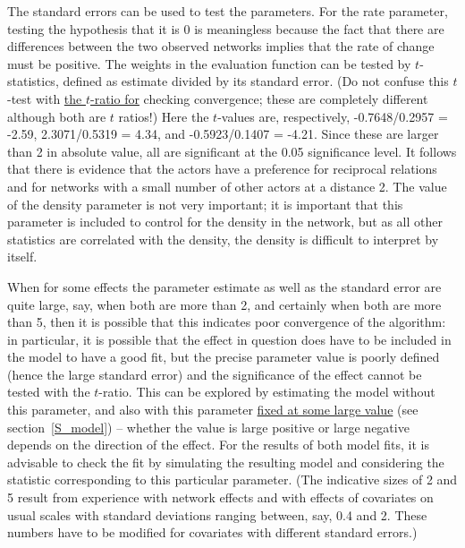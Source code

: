 \documentclass[a4paper,fleqn]{article}
\newcommand{\+}{\, + \,}
\begin{document}
{\begin{screen}
\newpage
\end{screen}
The standard errors can be used to test the parameters. For the rate
parameter, testing the hypothesis that it is 0 is meaningless
because the fact that there are differences between the two observed
networks implies that the rate of change must be positive. The
weights in the evaluation function can be tested by $t$-statistics,
defined as estimate divided by its standard error. (Do not confuse
this $t$-test with \hyperlink{T_convergence}{the $t$-ratio for}
checking convergence; these are completely different although both
are $t$ ratios!) Here the $t$-values are, respectively,
-0.7648/0.2957 = -2.59, 2.3071/0.5319 = 4.34, and -0.5923/0.1407 =
-4.21. Since these are larger than 2 in absolute value, all are
significant at the 0.05 significance level. It follows that there is
evidence that the actors have a preference for reciprocal relations
and for networks with a small number of other actors at a distance
2. The value of the density parameter is not very important; it is
important that this parameter is included to control for the density
in the network, but as all other statistics are correlated with the
density, the density is difficult to interpret by itself.

When for some effects the parameter estimate as well as the
standard error are quite large, say, when both are more than 2,
and certainly when both are more than 5, then it is possible that
this indicates poor convergence of the algorithm: in particular,
it is possible that the effect in question does have to be
included in the model to have a good fit, but the precise
parameter value is poorly defined (hence the large standard error)
and the significance of the effect cannot be tested with the
$t$-ratio. This can be explored by estimating the model without
this parameter, and also with this parameter
\hyperlink{T_fix}{fixed at some large value}
(see section~\ref{S_model}) -- whether the value is large positive or
large negative depends on the direction of the effect. For the
results of both model fits, it is advisable to check the fit by
simulating the resulting model and considering the statistic
corresponding to this particular parameter.
(The indicative sizes of 2 and 5 result from experience with
network effects and with effects of covariates on usual scales
with standard deviations ranging between, say, 0.4 and 2. These numbers have
to be modified for covariates with different standard errors.)
\medskip

}
\end{document}

